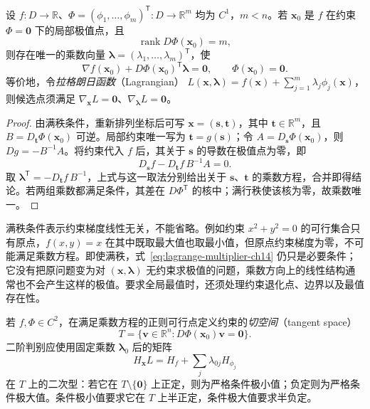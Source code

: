 \documentclass[UTF8,12pt,a4paper,fontset=fandol]{ctexbook}
\begin{document}
\begin{theorem}[拉格朗日乘数法的必要条件]
\label{thm:lagrange-multiplier-ch14}
设 $f:D\to\mathbb R$、$\Phi=(\phi_1,\ldots,\phi_m)^{\mathsf T}:D\to\mathbb R^m$ 均为 $C^1$，$m<n$。若 $\boldsymbol x_0$ 是 $f$ 在约束 $\Phi=\boldsymbol0$ 下的局部极值点，且
\[
    \operatorname{rank}D\Phi(\boldsymbol x_0)=m,
\]
则存在唯一的乘数向量 $\boldsymbol\lambda=(\lambda_1,\ldots,\lambda_m)^{\mathsf T}$，使
\begin{equation}
\label{eq:lagrange-multiplier-ch14}
    \nabla f(\boldsymbol x_0)+D\Phi(\boldsymbol x_0)^{\mathsf T}\boldsymbol\lambda
       =\boldsymbol0,\qquad
    \Phi(\boldsymbol x_0)=\boldsymbol0.
\end{equation}
等价地，令\emph{拉格朗日函数}（Lagrangian）
$L(\boldsymbol x,\boldsymbol\lambda)=f(\boldsymbol x)+\sum_{j=1}^m\lambda_j\phi_j(\boldsymbol x)$，则候选点须满足 $\nabla_{\boldsymbol x}L=\boldsymbol0$、$\nabla_{\boldsymbol\lambda}L=\boldsymbol0$。
\end{theorem}
\begin{proof}
由满秩条件，重新排列坐标后可写 $\boldsymbol x=(\boldsymbol s,\boldsymbol t)$，其中 $\boldsymbol t\in\mathbb R^m$，且 $B=D_{\boldsymbol t}\Phi(\boldsymbol x_0)$ 可逆。局部约束唯一写为 $\boldsymbol t=g(\boldsymbol s)$；令 $A=D_{\boldsymbol s}\Phi(\boldsymbol x_0)$，则 $Dg=-B^{-1}A$。将约束代入 $f$ 后，其关于 $\boldsymbol s$ 的导数在极值点为零，即
\[
    D_{\boldsymbol s}f-D_{\boldsymbol t}f\,B^{-1}A=0.
\]
取 $\boldsymbol\lambda^{\mathsf T}=-D_{\boldsymbol t}f\,B^{-1}$，上式与这一取法分别给出关于 $\boldsymbol s$、$\boldsymbol t$ 的乘数方程，合并即得结论。若两组乘数都满足条件，其差在 $D\Phi^{\mathsf T}$ 的核中；满行秩使该核为零，故乘数唯一。
\end{proof}

满秩条件表示约束梯度线性无关，不能省略。例如约束 $x^2+y^2=0$ 的可行集合只有原点，$f(x,y)=x$ 在其中既取最大值也取最小值，但原点约束梯度为零，不可能满足乘数方程。即使满秩，式~\eqref{eq:lagrange-multiplier-ch14} 仍只是必要条件；它没有把原问题变为对 $(\boldsymbol x,\boldsymbol\lambda)$ 无约束求极值的问题，乘数方向上的线性结构通常也不会产生这样的极值。要求全局最值时，还须处理约束退化点、边界以及最值存在性。

若 $f,\Phi\in C^2$，在满足乘数方程的正则可行点定义约束的\emph{切空间}（tangent space）
\[
    T=\{\boldsymbol v\in\mathbb R^n:D\Phi(\boldsymbol x_0)\boldsymbol v=\boldsymbol0\}.
\]
二阶判别应使用固定乘数 $\boldsymbol\lambda_0$ 后的矩阵
\[
    H_{\boldsymbol x}L
       =H_f+\sum_j\lambda_{0j}H_{\phi_j}
\]
在 $T$ 上的二次型：若它在 $T\setminus\{\boldsymbol0\}$ 上正定，则为严格条件极小值；负定则为严格条件极大值。条件极小值要求它在 $T$ 上半正定，条件极大值要求半负定。
\end{document}
